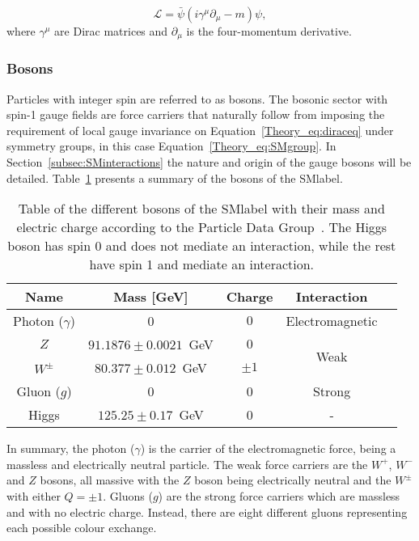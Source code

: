 \begin{equation}
\label{Theory_eq:diraceq}
    \mathcal{L} = \bar{\psi}(i\gamma^\mu\partial_\mu-m)\psi,
\end{equation}
where $\gamma^\mu$ are Dirac matrices and $\partial_\mu$ is the four-momentum derivative.

\subsubsection{Bosons}

Particles with integer spin are referred to as bosons. The bosonic sector with spin-1 gauge fields are force carriers that naturally follow from imposing the requirement of local gauge invariance on Equation~\ref{Theory_eq:diraceq} under symmetry groups, in this case Equation~\ref{Theory_eq:SMgroup}. In Section~\ref{subsec:SMinteractions} the nature and origin of the gauge bosons will be detailed. Table~\ref{tabSM:bosonscontent} presents a summary of the bosons of the \acrshort{SMlabel}.\\

\begin{table}[htbp]
    \begin{tabular}{ccccc}
    \toprule\toprule
    Name                  & Mass [GeV] & Charge & Interaction \\ \midrule
    Photon ($\gamma$)     &  0                             &  $0$ & Electromagnetic\\
    $Z$                   &  $91.1876 \pm 0.0021$~GeV      &  $0$ & \multirow{2}{*}{Weak} \\
    $W^\pm$               &  $80.377\pm 0.012$~GeV         &  $\pm 1$ & \\
    Gluon ($g$)           &  0                             &  0 & Strong \\
    Higgs                 &  $125.25\pm0.17$~GeV           &  0      & - \\
    \bottomrule\bottomrule
    \end{tabular}
    \caption{Table of the different bosons of the \acrshort{SMlabel} with their mass and electric charge according to the Particle Data Group~\cite{pdg}. The Higgs boson has spin 0 and does not mediate an interaction, while the rest have spin 1 and mediate an interaction.}
    \label{tabSM:bosonscontent}
    \end{table}

In summary, the photon ($\gamma$) is the carrier of the electromagnetic force, being a massless and electrically neutral particle.
The weak force carriers are the $W^+$, $W^-$ and $Z$ bosons, all massive with the $Z$ boson being electrically neutral and the $W^\pm$ with either $Q=\pm1$. Gluons ($g$) are the strong force carriers which are massless and with no electric charge. Instead, there are eight different gluons representing each possible colour exchange. 

